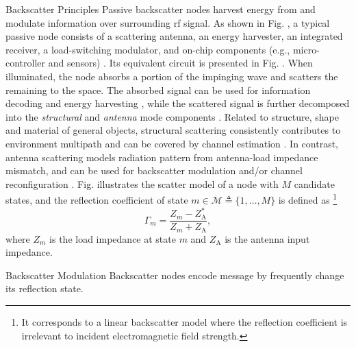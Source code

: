 \documentclass[journal]{IEEEtran}
\begin{document}
\begin{section}{Backscatter Principles}
	Passive backscatter nodes harvest energy from and modulate information over surrounding \gls{rf} signal.
	As shown in Fig. , a typical passive node consists of a scattering antenna, an energy harvester, an integrated receiver, a load-switching modulator, and on-chip components (e.g., micro-controller and sensors) \cite{Dobkin2012}.
	Its equivalent circuit is presented in Fig. .
	When illuminated, the node absorbs a portion of the impinging wave and scatters the remaining to the space.
	The absorbed signal can be used for information decoding and energy harvesting \cite{Kim2021a}, while the scattered signal is further decomposed into the \emph{structural} and \emph{antenna} mode components \cite{Hansen1989}.
	Related to structure, shape and material of general objects, structural scattering consistently contributes to environment multipath and can be covered by channel estimation \cite{Boyer2014}.
	In contrast, antenna scattering models radiation pattern from antenna-load impedance mismatch, and can be used for backscatter modulation \cite{Boyer2012} and/or channel reconfiguration \cite{Wu2021b}.
	Fig.  illustrates the scatter model of a node with $M$ candidate states, and the reflection coefficient of state $m \in \mathcal{M} \triangleq \{1,\ldots,M\}$ is defined as%
	\footnote{It corresponds to a linear backscatter model where the reflection coefficient is irrelevant to incident electromagnetic field strength.}
	\begin{equation}
		\Gamma_m = \frac{Z_m - Z_{\mathrm{A}}^*}{Z_m + Z_{\mathrm{A}}},
		\label{eq:reflection_coefficient}
	\end{equation}
	where $Z_m$ is the load impedance at state $m$ and $Z_{\mathrm{A}}$ is the antenna input impedance.

	\begin{subsection}{Backscatter Modulation}
		Backscatter nodes encode message by frequently change its reflection state.



\end{subsection}
\end{section}
\end{document}
